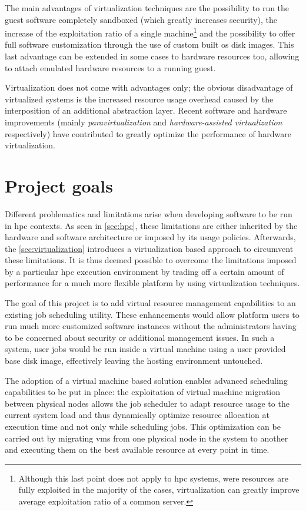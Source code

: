 The main advantages of virtualization techniques are the possibility to run the guest software completely sandboxed (which greatly increases security), the increase of the exploitation ratio of a single machine\footnote{Although this last point does not apply to \gls{hpc} systems, were resources are fully exploited in the majority of the cases, virtualization can greatly improve average exploitation ratio of a common server.} and the possibility to offer full software customization through the use of custom built \gls{os} disk images. This last advantage can be extended in some cases to hardware resources too, allowing to attach emulated hardware resources to a running guest.

Virtualization does not come with advantages only; the obvious disadvantage of virtualized systems is the increased resource usage overhead caused by the interposition of an additional abstraction layer. Recent software and hardware improvements (mainly \emph{paravirtualization} and \emph{hardware-assisted virtualization} respectively) have contributed to greatly optimize the performance of hardware virtualization.


\section{Project goals}
\label{sec:goals}

Different problematics and limitations arise when developing software to be run in \gls{hpc} contexts. As seen in \autoref{sec:hpc}, these limitations are either inherited by the hardware and software architecture or imposed by its usage policies. Afterwards, the \autoref{sec:virtualization} introduces a virtualization based approach to circumvent these limitations. It is thus deemed possible to overcome the limitations imposed by a particular \gls{hpc} execution environment by trading off a certain amount of performance for a much more flexible platform by using virtualization techniques.

The goal of this project is to add virtual resource management capabilities to an existing job scheduling utility. These enhancements would allow platform users to run much more customized software instances without the administrators having to be concerned about security or additional management issues. In such a system, user jobs would be run inside a virtual machine using a user provided base disk image, effectively leaving the hosting environment untouched.

The adoption of a virtual machine based solution enables advanced scheduling capabilities to be put in place: the exploitation of virtual machine migration between physical nodes allows the job scheduler to adapt resource usage to the current system load and thus dynamically optimize resource allocation at execution time and not only while scheduling jobs. This optimization can be carried out by migrating \glspl{vm} from one physical node in the system to another and executing them on the best available resource at every point in time.

